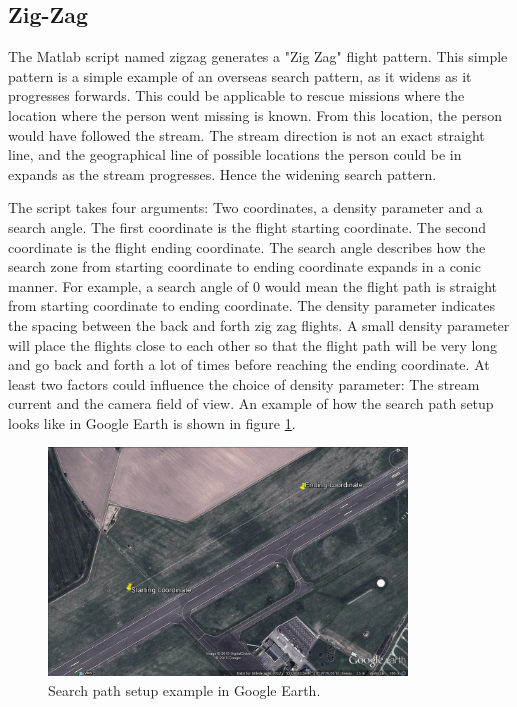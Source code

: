 \subsection{Zig-Zag}
The Matlab script named zigzag generates a "Zig Zag" flight pattern.
This simple pattern is a simple example of an overseas search pattern, as it widens as it progresses forwards.
This could be applicable to rescue missions where the location where the person went missing is known.
From this location, the person would have followed the stream.
The stream direction is not an exact straight line, and the geographical line of possible locations
the person could be in expands as the stream progresses. Hence the widening search pattern.

The script takes four arguments: Two coordinates, a density parameter and a search angle.
The first coordinate is the flight starting coordinate. The second coordinate is the flight ending
coordinate.
The search angle describes how the search zone from starting coordinate to ending coordinate
expands in a conic manner.
For example, a search angle of 0 would mean the flight path is straight from starting coordinate to
ending coordinate.
The density parameter indicates the spacing between the back and forth zig zag flights.
A small density parameter will place the flights close to each other so that
the flight path will be very long and go back and forth a lot of times before reaching the ending
coordinate.
At least two factors could influence the choice of density parameter: The stream current and the camera field of view.
An example of how the search path setup looks like in Google Earth is shown in figure
\ref{fig:googlepath}.
\begin{figure}[ht]
	\centering
	\includegraphics[width=0.85\textwidth]{Images/googlepath}
	\caption[Search path setup.]{Search path setup example in Google Earth.}
	\label{fig:googlepath}
\end{figure}
